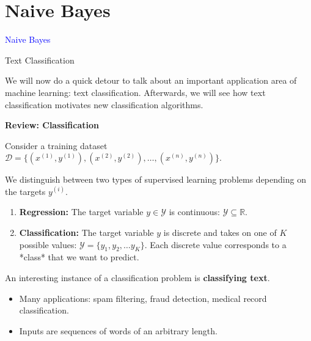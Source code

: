 \documentclass[../../generative_classifiers.tex]{subfiles}
\begin{document}
\graphicspath{{figures/}{lectures/06_naive_bayes/figures/}}
\section{Naive Bayes}
\begin{frame}[plain]
  \vfill\begin{center}{\Huge \textcolor{blue}{Naive Bayes}}\end{center}\vfill
\end{frame}
\begin{frame}[fragile]{Text Classification}

We will now do a quick detour to talk about an important application area of machine learning: text classification. Afterwards, we will see how text classification motivates new classification algorithms.


\vspace{0.2cm}

\textbf{Review: Classification}

Consider a training dataset $\mathcal{D} = \{(x^{(1)}, y^{(1)}), (x^{(2)}, y^{(2)}), \ldots, (x^{(n)}, y^{(n)})\}$.

We distinguish between two types of supervised learning problems depending on the targets $y^{(i)}$. 

\begin{enumerate}
    \item \textbf{Regression:} The target variable $y \in \mathcal{Y}$ is continuous:  $\mathcal{Y} \subseteq \mathbb{R}$.
    \item \textbf{Classification:} The target variable $y$ is discrete and takes on one of $K$ possible values:  $\mathcal{Y} = \{y_1, y_2, \ldots y_K\}$. Each discrete value corresponds to a *class* that we want to predict.
\end{enumerate}

An interesting instance of a classification problem is \textbf{classifying text}.
\begin{itemize}
    \item Many applications: spam filtering, fraud detection, medical record classification.
    \item Inputs are sequences of words of an arbitrary length.
\end{itemize}
\end{frame}
\end{document}
